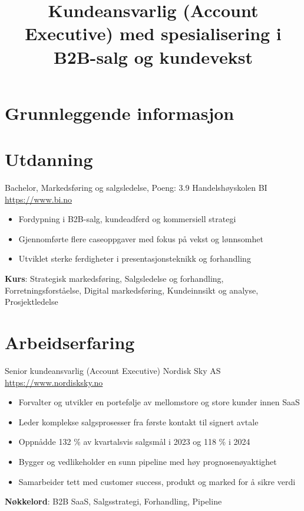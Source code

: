 \documentclass[a4paper, serif, 10pt]{moderncv}
\title{Kundeansvarlig (Account Executive) med spesialisering i B2B-salg og kundevekst}
\begin{document}
\maketitle

\section{Grunnleggende informasjon}

\section{Utdanning}

        {Bachelor, Markedsføring og salgsledelse, Poeng: 3.9}
        {Handelshøyskolen BI}
        {\url{https://www.bi.no}}
        {}
        {\begin{itemize}
\item Fordypning i B2B-salg, kundeadferd og kommersiell strategi
\item Gjennomførte flere caseoppgaver med fokus på vekst og lønnsomhet
\item Utviklet sterke ferdigheter i presentasjonsteknikk og forhandling
\end{itemize}
\textbf{Kurs}: Strategisk markedsføring, Salgsledelse og forhandling, Forretningsforståelse, Digital markedsføring, Kundeinnsikt og analyse, Prosjektledelse}
\section{Arbeidserfaring}

        {Senior kundeansvarlig (Account Executive)}
        {Nordisk Sky AS}
        {\url{https://www.nordisksky.no}}
        {}
        {\begin{itemize}
\item Forvalter og utvikler en portefølje av mellomstore og store kunder innen SaaS
\item Leder komplekse salgsprosesser fra første kontakt til signert avtale
\item Oppnådde 132 \% av kvartalsvis salgsmål i 2023 og 118 \% i 2024
\item Bygger og vedlikeholder en sunn pipeline med høy prognosenøyaktighet
\item Samarbeider tett med customer success, produkt og marked for å sikre verdi
\end{itemize}
\textbf{Nøkkelord}: B2B SaaS, Salgsstrategi, Forhandling, Pipeline}
\end{document}
